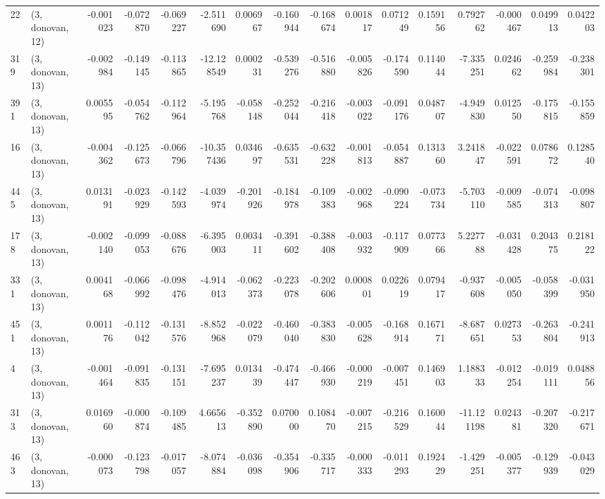 \begin{tabular}{llrrrrrrrrrrrrrr}
22  &  (3, donovan, 12) &  -0.001023 & -0.072870 & -0.069227 &   -2.511690 &  0.006967 &  -0.160944 & -0.168674 &  0.001817 &  0.071249 &  0.159156 &    0.792762 & -0.000467 &  0.049913 &  0.042203 \\
319 &  (3, donovan, 13) &  -0.002984 & -0.149145 & -0.113865 &  -12.128549 &  0.000231 &  -0.539276 & -0.516880 & -0.005826 & -0.174590 &  0.114044 &   -7.335251 &  0.024662 & -0.259984 & -0.238301 \\
391 &  (3, donovan, 13) &   0.005595 & -0.054762 & -0.112964 &   -5.195768 & -0.058148 &  -0.252044 & -0.216418 & -0.003022 & -0.091176 &  0.048707 &   -4.949830 &  0.012550 & -0.175815 & -0.155859 \\
16  &  (3, donovan, 13) &  -0.004362 & -0.125673 & -0.066796 &  -10.357436 &  0.034697 &  -0.635531 & -0.632228 & -0.001813 & -0.054887 &  0.131360 &    3.241847 & -0.022591 &  0.078672 &  0.128540 \\
445 &  (3, donovan, 13) &   0.013191 & -0.023929 & -0.142593 &   -4.039974 & -0.201926 &  -0.184978 & -0.109383 & -0.002968 & -0.090224 & -0.073734 &   -5.703110 & -0.009585 & -0.074313 & -0.098807 \\
178 &  (3, donovan, 13) &  -0.002140 & -0.099053 & -0.088676 &   -6.395003 &  0.003411 &  -0.391602 & -0.388408 & -0.003932 & -0.117909 &  0.077366 &    5.227788 & -0.031428 &  0.204375 &  0.218122 \\
331 &  (3, donovan, 13) &   0.004168 & -0.066992 & -0.098476 &   -4.914013 & -0.062373 &  -0.223078 & -0.202606 &  0.000801 &  0.022619 &  0.079417 &   -0.937608 & -0.005050 & -0.058399 & -0.031950 \\
451 &  (3, donovan, 13) &   0.001176 & -0.112042 & -0.131576 &   -8.852968 & -0.022079 &  -0.460040 & -0.383830 & -0.005628 & -0.168914 &  0.167171 &   -8.687651 &  0.027353 & -0.263804 & -0.241913 \\
4   &  (3, donovan, 13) &  -0.001464 & -0.091835 & -0.131151 &   -7.695237 &  0.013439 &  -0.474447 & -0.466930 & -0.000219 & -0.007451 &  0.146903 &    1.188333 & -0.012254 & -0.019111 &  0.048856 \\
313 &  (3, donovan, 13) &   0.016960 & -0.000874 & -0.109485 &    4.665613 & -0.352890 &   0.070000 &  0.108470 & -0.007215 & -0.216529 &  0.160044 &  -11.121198 &  0.024381 & -0.207320 & -0.217671 \\
463 &  (3, donovan, 13) &  -0.000073 & -0.123798 & -0.017057 &   -8.074884 & -0.036098 &  -0.354906 & -0.335717 & -0.000333 & -0.011293 &  0.192429 &   -1.429251 & -0.005377 & -0.129939 & -0.043029 \\

\end{tabular}
